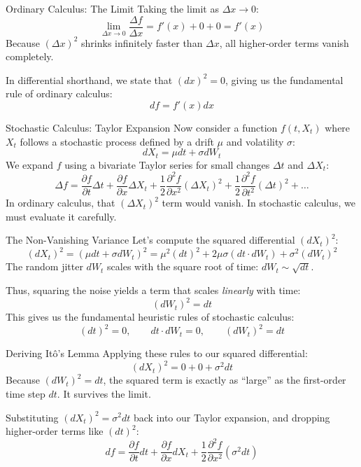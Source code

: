 \documentclass{beamer}
\begin{document}
\begin{frame}{Ordinary Calculus: The Limit}
Taking the limit as $\Delta x \to 0$:
\[
\lim_{\Delta x \to 0} \frac{\Delta f}{\Delta x} = f'(x) + 0 + 0 = f'(x)
\]
Because $(\Delta x)^2$ shrinks infinitely faster than $\Delta x$, all higher-order terms vanish completely.
\medskip

In differential shorthand, we state that $(dx)^2 = 0$, giving us the fundamental rule of ordinary calculus:
\[
df = f'(x) dx
\]
\end{frame}

\begin{frame}{Stochastic Calculus: Taylor Expansion}
Now consider a function $f(t, X_t)$ where $X_t$ follows a stochastic process defined by a drift $\mu$ and volatility $\sigma$:
\[ dX_t = \mu dt + \sigma dW_t \]
We expand $f$ using a bivariate Taylor series for small changes $\Delta t$ and $\Delta X_t$:
\[
\Delta f = \frac{\partial f}{\partial t}\Delta t + \frac{\partial f}{\partial x}\Delta X_t + \frac{1}{2}\frac{\partial^2 f}{\partial x^2}(\Delta X_t)^2 + \frac{1}{2}\frac{\partial^2 f}{\partial t^2}(\Delta t)^2 + \dots
\]
In ordinary calculus, that $(\Delta X_t)^2$ term would vanish. In stochastic calculus, we must evaluate it carefully.
\end{frame}

\begin{frame}{The Non-Vanishing Variance}
Let's compute the squared differential $(dX_t)^2$:
\[
(dX_t)^2 = (\mu dt + \sigma dW_t)^2 = \mu^2(dt)^2 + 2\mu\sigma(dt \cdot dW_t) + \sigma^2(dW_t)^2
\]
The random jitter $dW_t$ scales with the square root of time: $dW_t \sim \sqrt{dt}$.
\medskip

Thus, squaring the noise yields a term that scales \textit{linearly} with time:
\[ (dW_t)^2 = dt \]
This gives us the fundamental heuristic rules of stochastic calculus:
\[ (dt)^2 = 0, \qquad dt \cdot dW_t = 0, \qquad (dW_t)^2 = dt \]
\end{frame}

\begin{frame}{Deriving It\^o's Lemma}
Applying these rules to our squared differential:
\[
(dX_t)^2 = 0 + 0 + \sigma^2 dt
\]
Because $(dW_t)^2 = dt$, the squared term is exactly as ``large'' as the first-order time step $dt$. It survives the limit.
\medskip

Substituting $(dX_t)^2 = \sigma^2 dt$ back into our Taylor expansion, and dropping higher-order terms like $(dt)^2$:
\[
df = \frac{\partial f}{\partial t}dt + \frac{\partial f}{\partial x}dX_t + \frac{1}{2}\frac{\partial^2 f}{\partial x^2}(\sigma^2 dt)
\]
\end{frame}
\end{document}
